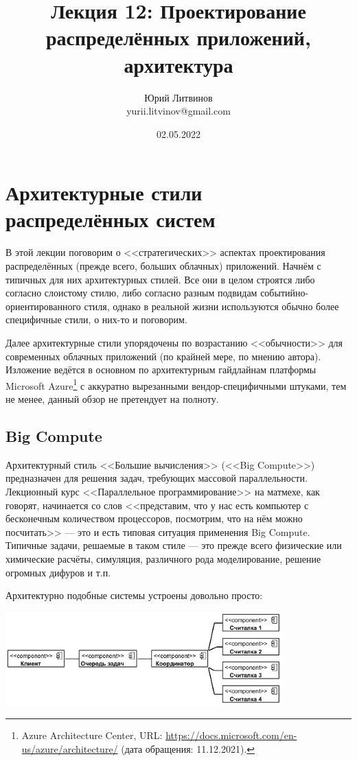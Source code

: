 \documentclass[a5paper]{article}
\title{Лекция 12: Проектирование распределённых приложений, архитектура}
\author{Юрий Литвинов\\\small{yurii.litvinov@gmail.com}}
\date{02.05.2022}
\begin{document}
\maketitle
\thispagestyle{empty}

\section{Архитектурные стили распределённых систем}

В этой лекции поговорим о <<стратегических>> аспектах проектирования распределённых (прежде всего, больших облачных) приложений. Начнём с типичных для них архитектурных стилей. Все они в целом строятся либо согласно слоистому стилю, либо согласно разным подвидам событийно-ориентированного стиля, однако в реальной жизни используются обычно более специфичные стили, о них-то и поговорим.

Далее архитектурные стили упорядочены по возрастанию <<обычности>> для современных облачных приложений (по крайней мере, по мнению автора). Изложение ведётся в основном по архитектурным гайдлайнам платформы Microsoft Azure\footnote{Azure Architecture Center, URL: \url{https://docs.microsoft.com/en-us/azure/architecture/} (дата обращения: 11.12.2021).} с аккуратно вырезанными вендор-специфичными штуками, тем не менее, данный обзор не претендует на полноту.

\subsection{Big Compute}

Архитектурный стиль <<Большие вычисления>> (<<Big Compute>>) предназначен для решения задач, требующих массовой параллельности. Лекционный курс <<Параллельное программирование>> на матмехе, как говорят, начинается со слов <<представим, что у нас есть компьютер с бесконечным количеством процессоров, посмотрим, что на нём можно посчитать>> --- это и есть типовая ситуация применения Big Compute. Типичные задачи, решаемые в таком стиле --- это прежде всего физические или химические расчёты, симуляция, различного рода моделирование, решение огромных дифуров и т.п. 

Архитектурно подобные системы устроены довольно просто:

\begin{center}
    \includegraphics[width=0.8\textwidth]{bigCompute.png}
\end{center}
\end{document}
